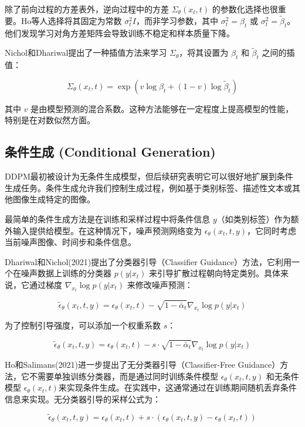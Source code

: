 \documentclass{ctexart}
\begin{document}
\noindent
除了前向过程的方差表外，逆向过程中的方差 $\Sigma_\theta(x_t, t)$ 的参数化选择也很重要。Ho等人选择将其固定为常数 $\sigma_t^2 I$，而非学习参数，其中 $\sigma_t^2 = \beta_t$ 或 $\sigma_t^2 = \tilde{\beta}_t$。他们发现学习对角方差矩阵会导致训练不稳定和样本质量下降。

\noindent
Nichol和Dhariwal提出了一种插值方法来学习 $\Sigma_\theta$，将其设置为 $\beta_t$ 和 $\tilde{\beta}_t$ 之间的插值：

$$ \Sigma_\theta(x_t, t) = \exp(v \log \beta_t + (1 - v) \log \tilde{\beta}_t) $$

\noindent
其中 $v$ 是由模型预测的混合系数。这种方法能够在一定程度上提高模型的性能，特别是在对数似然方面。

\subsection{条件生成 (Conditional Generation)}
\noindent
DDPM最初被设计为无条件生成模型，但后续研究表明它可以很好地扩展到条件生成任务。条件生成允许我们控制生成过程，例如基于类别标签、描述性文本或其他图像生成特定的图像。

\noindent
最简单的条件生成方法是在训练和采样过程中将条件信息 $y$（如类别标签）作为额外输入提供给模型。在这种情况下，噪声预测网络变为 $\epsilon_\theta(x_t, t, y)$，它同时考虑当前噪声图像、时间步和条件信息。

\noindent
Dhariwal和Nichol(2021)提出了分类器引导（Classifier Guidance）方法，它利用一个在噪声数据上训练的分类器 $p(y|x_t)$ 来引导扩散过程朝向特定类别。具体来说，它通过梯度 $\nabla_{x_t} \log p(y|x_t)$ 来修改噪声预测：

$$ \tilde{\epsilon}_\theta(x_t, t, y) = \epsilon_\theta(x_t, t) - \sqrt{1 - \bar{\alpha}_t} \nabla_{x_t} \log p(y|x_t) $$

\noindent
为了控制引导强度，可以添加一个权重系数 $s$：

$$ \tilde{\epsilon}_\theta(x_t, t, y) = \epsilon_\theta(x_t, t) - s \cdot \sqrt{1 - \bar{\alpha}_t} \nabla_{x_t} \log p(y|x_t) $$

\noindent
Ho和Salimans(2021)进一步提出了无分类器引导（Classifier-Free Guidance）方法，它不需要单独训练分类器，而是通过同时训练条件模型 $\epsilon_\theta(x_t, t, y)$ 和无条件模型 $\epsilon_\theta(x_t, t)$来实现条件生成。在实践中，这通常通过在训练期间随机丢弃条件信息来实现。无分类器引导的采样公式为：

$$ \tilde{\epsilon}_\theta(x_t, t, y) = \epsilon_\theta(x_t, t) + s \cdot (\epsilon_\theta(x_t, t, y) - \epsilon_\theta(x_t, t)) $$
\end{document}
